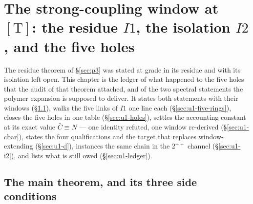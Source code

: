 \begingroup
\renewcommand{\code}[1]{\texttt{\footnotesize\detokenize{#1}}}

\section{The strong-coupling window at $[\mathrm T]$: the residue $I1$, the isolation $I2$, and
the five holes}
\label{ch:uncond-i1}

\noindent The residue theorem of \S\ref{sec:p3} was stated at grade \LT{} in its residue and with
its isolation left open. This chapter is the ledger of what happened to the five holes that the
audit of that theorem attached, and of the two spectral statements the polymer expansion is
supposed to deliver. It states both statements with their windows (\S\ref{sec:u1-theorem}), walks
the five links of $I1$ one line each (\S\ref{sec:u1-five-rings}), closes the five holes in one
table (\S\ref{sec:u1-holes}), settles the accounting constant at its exact value $\bar C\equiv N$
--- one identity refuted, one window re-derived (\S\ref{sec:u1-cbar}), states the four
qualifications and the target that replaces window-extending (\S\ref{sec:u1-d}), instances the
same chain in the $2^{++}$ channel (\S\ref{sec:u1-i2}), and lists what is still owed
(\S\ref{sec:u1-ledger}).

\subsection{The main theorem, and its three side conditions}
\label{sec:u1-theorem}

